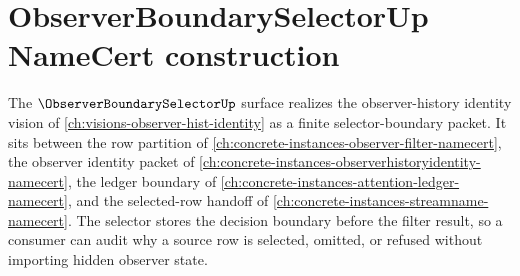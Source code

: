 \chapter{ObserverBoundarySelectorUp NameCert construction}
\label{ch:concrete-instances-observerboundaryselector-namecert}

The $\ObserverBoundarySelectorUp$ surface realizes the observer-history identity vision of \autoref{ch:visions-observer-hist-identity} as a finite selector-boundary packet. It sits between the row partition of \autoref{ch:concrete-instances-observer-filter-namecert}, the observer identity packet of \autoref{ch:concrete-instances-observerhistoryidentity-namecert}, the ledger boundary of \autoref{ch:concrete-instances-attention-ledger-namecert}, and the selected-row handoff of \autoref{ch:concrete-instances-streamname-namecert}. The selector stores the decision boundary before the filter result, so a consumer can audit why a source row is selected, omitted, or refused without importing hidden observer state.



